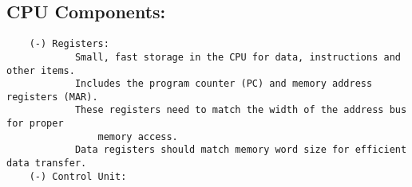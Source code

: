 \documentclass{article}
\begin{document}
\subsection*{CPU Components:}
\begin{verbatim}
    (-) Registers:
            Small, fast storage in the CPU for data, instructions and other items.
            Includes the program counter (PC) and memory address registers (MAR).
            These registers need to match the width of the address bus for proper 
                memory access.
            Data registers should match memory word size for efficient data transfer.
    (-) Control Unit:
            

\end{verbatim}
\end{document}
